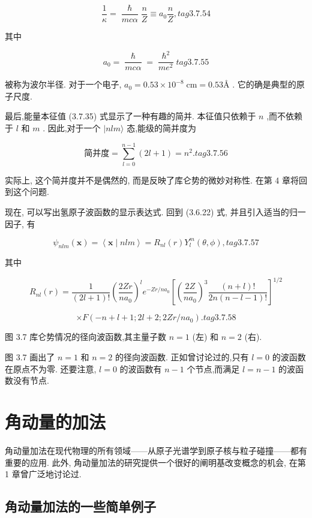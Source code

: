 $$
\frac{1}{\kappa } = \frac{\hslash }{mc\alpha }\frac{n}{Z} \equiv {a}_{0}\frac{n}{Z}, tag{3. 7.54}
$$

其中

$$
{a}_{0} = \frac{\hslash }{mc\alpha } = \frac{{\hslash }^{2}}{m{e}^{2}} tag{3. 7.55}
$$

被称为波尔半径. 对于一个电子, ${a}_{0} = {0.53} \times {10}^{-8}\mathrm{\;{cm}} = {0.53Å}$ . 它的确是典型的原子尺度.

最后,能量本征值 (3.7.35) 式显示了一种有趣的简并. 本征值只依赖于 $n$ ,而不依赖于 $l$ 和 $m$ . 因此,对于一个 $|{nlm}\rangle$ 态,能级的简并度为

$$
\text{简并度} = \mathop{\sum }\limits_{{l = 0}}^{{n - 1}}\left( {{2l} + 1}\right) = {n}^{2}\text{.} tag{3. 7.56}
$$

实际上, 这个简并度并不是偶然的, 而是反映了库仑势的微妙对称性. 在第 4 章将回到这个问题.

现在, 可以写出氢原子波函数的显示表达式. 回到 (3.6.22) 式, 并且引入适当的归一因子, 有

$$
{\psi }_{nlm}\left( \mathbf{x}\right) = \left\langle {\mathbf{x} \mid {nlm}}\right\rangle = {R}_{nl}\left( r\right) {Y}_{l}^{m}\left( {\theta ,\phi }\right) , tag{3. 7.57}
$$

其中

$$
{R}_{nl}\left( r\right) = \frac{1}{\left( {{2l} + 1}\right) !}{\left( \frac{2Zr}{n{a}_{0}}\right) }^{l}{e}^{-{Zr}/n{a}_{0}}{\left\lbrack {\left( \frac{2Z}{n{a}_{0}}\right) }^{3}\frac{\left( {n + l}\right) !}{{2n}\left( {n - l - 1}\right) !}\right\rbrack }^{1/2}
$$

$$
\times F\left( {-n + l + 1;{2l} + 2;{2Zr}/n{a}_{0}}\right) . tag{3. 7.58}
$$


图 3.7 库仑势情况的径向波函数,其主量子数 $n = 1$ (左) 和 $n = 2$ (右).

图 3.7 画出了 $n = 1$ 和 $n = 2$ 的径向波函数. 正如曾讨论过的,只有 $l = 0$ 的波函数在原点不为零. 还要注意, $l = 0$ 的波函数有 $n - 1$ 个节点,而满足 $l = n - 1$ 的波函数没有节点.

\section{角动量的加法}

角动量加法在现代物理的所有领域——从原子光谱学到原子核与粒子碰撞——都有重要的应用. 此外, 角动量加法的研究提供一个很好的阐明基改变概念的机会, 在第 1 章曾广泛地讨论过.

\subsection{角动量加法的一些简单例子}


